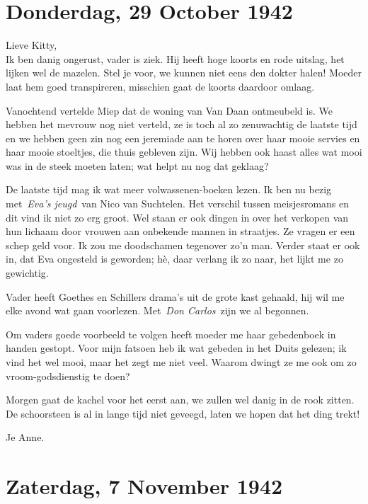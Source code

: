 \documentclass{book}
\begin{document}
\section*{Donderdag, 29 October 1942}

Lieve Kitty,\\
Ik ben danig ongerust, vader is ziek. Hij heeft hoge koorts en
rode uitslag, het lijken wel de mazelen. Stel je voor, we kunnen niet eens den
dokter halen! Moeder laat hem goed transpireren, misschien gaat de koorts
daardoor omlaag.

Vanochtend vertelde Miep dat de woning van Van Daan ontmeubeld is. We hebben het
mevrouw nog niet verteld, ze is toch al zo zenuwachtig de laatste tijd en we
hebben geen zin nog een jeremiade aan te horen over haar mooie servies en haar
mooie stoeltjes, die thuis gebleven zijn. Wij hebben ook haast alles wat mooi
was in de steek moeten laten; wat helpt nu nog dat geklaag?

De laatste tijd mag ik wat meer volwassenen-boeken lezen. Ik ben nu bezig
met~\emph{Eva's jeugd}~van Nico van Suchtelen. Het verschil tussen meisjesromans
en dit vind ik niet zo erg groot. Wel staan er ook dingen in over het verkopen
van hun lichaam door vrouwen aan onbekende mannen in straatjes. Ze vragen er een
schep geld voor. Ik zou me doodschamen tegenover zo'n man. Verder staat er ook
in, dat Eva ongesteld is geworden; hè, daar verlang ik zo naar, het lijkt me zo
gewichtig.

Vader heeft Goethes en Schillers drama's uit de grote kast gehaald, hij wil me
elke avond wat gaan voorlezen. Met~\emph{Don Carlos}~zijn we al begonnen.

Om vaders goede voorbeeld te volgen heeft moeder me haar gebedenboek in handen
gestopt. Voor mijn fatsoen heb ik wat gebeden in het Duits gelezen; ik vind het
wel mooi, maar het zegt me niet veel. Waarom dwingt ze me ook om zo
vroom-godsdienstig te doen?

Morgen gaat de kachel voor het eerst aan, we zullen wel danig in de rook zitten.
De schoorsteen is al in lange tijd niet geveegd, laten we hopen dat het ding
trekt!

Je Anne.

\section*{Zaterdag, 7 November 1942}
\end{document}
